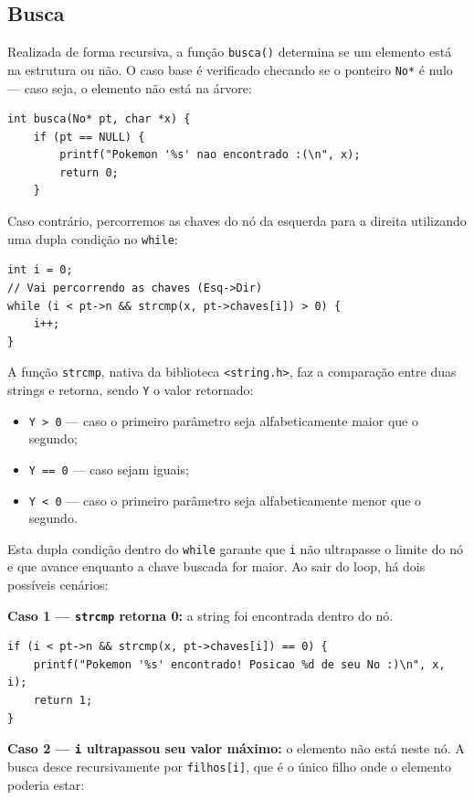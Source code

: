 \documentclass[12pt,a4paper]{article}
\begin{document}
\subsection{Busca}

Realizada de forma recursiva, a função \texttt{busca()} determina se um elemento está na estrutura ou não. O caso base é verificado checando se o ponteiro \texttt{No*} é nulo — caso seja, o elemento não está na árvore:

\begin{lstlisting}
int busca(No* pt, char *x) {
    if (pt == NULL) {
        printf("Pokemon '%s' nao encontrado :(\n", x);
        return 0;
    }
\end{lstlisting}

Caso contrário, percorremos as chaves do nó da esquerda para a direita utilizando uma dupla condição no \texttt{while}:

\begin{lstlisting}
int i = 0;
// Vai percorrendo as chaves (Esq->Dir)
while (i < pt->n && strcmp(x, pt->chaves[i]) > 0) {
    i++;
}
\end{lstlisting}

A função \texttt{strcmp}, nativa da biblioteca \texttt{<string.h>}, faz a comparação entre duas strings e retorna, sendo \texttt{Y} o valor retornado:

\begin{itemize}
    \item \texttt{Y > 0} — caso o primeiro parâmetro seja alfabeticamente maior que o segundo;
    \item \texttt{Y == 0} — caso sejam iguais;
    \item \texttt{Y < 0} — caso o primeiro parâmetro seja alfabeticamente menor que o segundo.
\end{itemize}

Esta dupla condição dentro do \texttt{while} garante que \texttt{i} não ultrapasse o limite do nó e que avance enquanto a chave buscada for maior. Ao sair do loop, há dois possíveis cenários:

\textbf{Caso 1 — \texttt{strcmp} retorna 0:} a string foi encontrada dentro do nó.

\begin{lstlisting}
if (i < pt->n && strcmp(x, pt->chaves[i]) == 0) {
    printf("Pokemon '%s' encontrado! Posicao %d de seu No :)\n", x, i);
    return 1;
}
\end{lstlisting}

\textbf{Caso 2 — \texttt{i} ultrapassou seu valor máximo:} o elemento não está neste nó. A busca desce recursivamente por \texttt{filhos[i]}, que é o único filho onde o elemento poderia estar:
\end{document}
